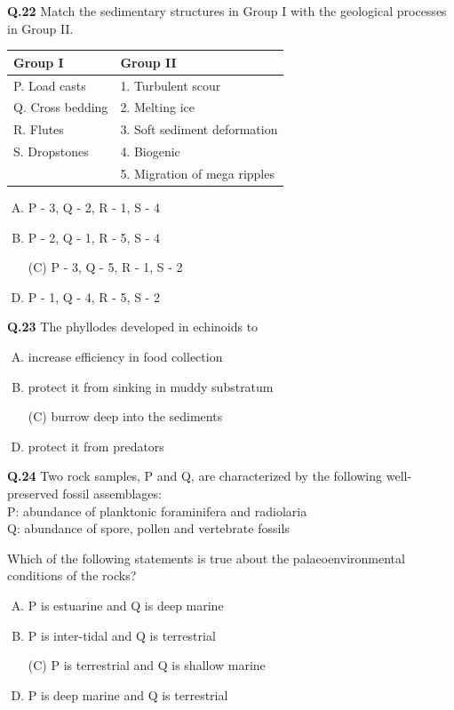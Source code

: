\textbf{Q.22} Match the sedimentary structures in Group I with the geological processes in Group II.

\begin{center}
\begin{tabular}{ll}
Group I & Group II \\
\hline
P. Load casts & 1. Turbulent scour \\
Q. Cross bedding & 2. Melting ice \\
R. Flutes & 3. Soft sediment deformation \\
S. Dropstones & 4. Biogenic \\
& 5. Migration of mega ripples \\
\end{tabular}
\end{center}

\begin{enumerate}[(A)]
\item P - 3, Q - 2, R - 1, S - 4 \item  P - 2, Q - 1, R - 5, S - 4
\item[(C)] P - 3, Q - 5, R - 1, S - 2 \item  P - 1, Q - 4, R - 5, S - 2
\end{enumerate}

\textbf{Q.23} The phyllodes developed in echinoids to
\begin{enumerate}[(A)]
\item increase efficiency in food collection \item  protect it from sinking in muddy substratum
\item[(C)] burrow deep into the sediments \item  protect it from predators
\end{enumerate}

\textbf{Q.24} Two rock samples, P and Q, are characterized by the following well-preserved fossil assemblages:\\
P: abundance of planktonic foraminifera and radiolaria\\
Q: abundance of spore, pollen and vertebrate fossils

Which of the following statements is true about the palaeoenvironmental conditions of the rocks?
\begin{enumerate}[(A)]
\item P is estuarine and Q is deep marine \item  P is inter-tidal and Q is terrestrial
\item[(C)] P is terrestrial and Q is shallow marine \item  P is deep marine and Q is terrestrial
\end{enumerate}


